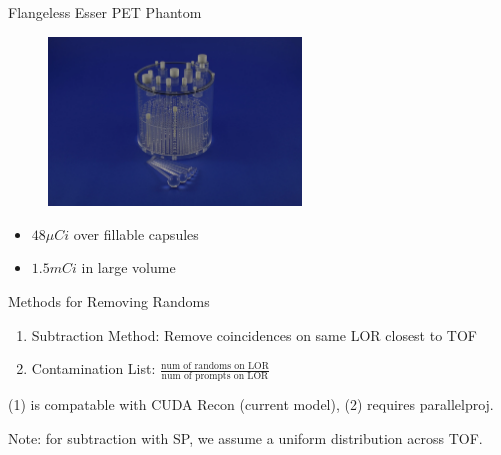 \documentclass[pdf]{beamer}
\begin{document}
\begin{frame}{Flangeless Esser PET Phantom}
    \begin{figure}
        \centering
        \includegraphics[width=0.6\textwidth]{figures/flangeless.png}
    \end{figure}

    \begin{itemize}
        \item $48 \mu Ci$ over fillable capsules
        \item $1.5 mCi$ in large volume
    \end{itemize}
\end{frame}

\begin{frame}{Methods for Removing Randoms}
    \begin{enumerate}
        \item Subtraction Method: Remove coincidences on same LOR closest to TOF
        \item Contamination List: $\frac{\text{num of randoms on LOR}}{\text{num of prompts on LOR}}$
    \end{enumerate}
    
    \vspace{0.25in}

    (1) is compatable with CUDA Recon (current model), (2) requires parallelproj.

    \vspace{0.25in}

    Note: for subtraction with SP, we assume a uniform distribution across TOF.
\end{frame}
\end{document}
